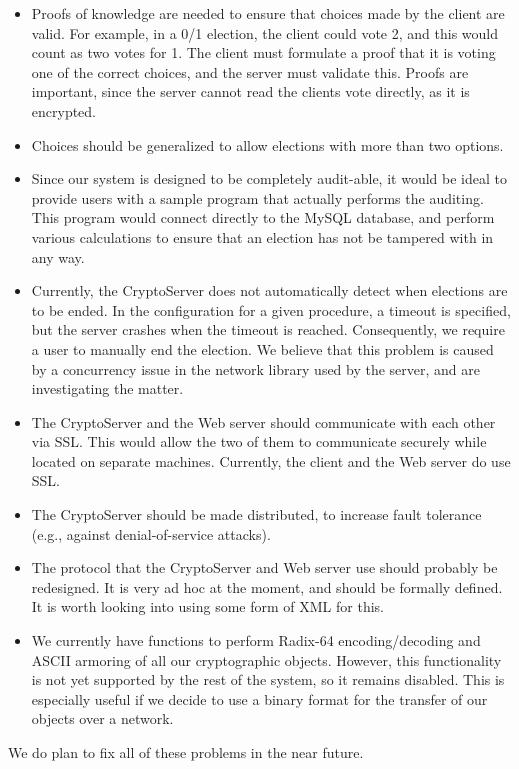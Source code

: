 \documentclass[letterpaper,10pt]{article}
\begin{document}
\begin{itemize}
\item Proofs of knowledge are needed to ensure that choices made by
  the client are valid. For example, in a 0/1 election, the client
  could vote 2, and this would count as two votes for 1.  The client
  must formulate a proof that it is voting one of the correct choices,
  and the server must validate this.  Proofs are important, since the
  server cannot read the clients vote directly, as it is encrypted.
  
\item Choices should be generalized to allow elections with more than
  two options.
  
\item Since our system is designed to be completely audit-able, it
  would be ideal to provide users with a sample program that actually
  performs the auditing.  This program would connect directly to the
  MySQL database, and perform various calculations to ensure that an
  election has not be tampered with in any way.
  
\item Currently, the CryptoServer does not automatically detect when
  elections are to be ended. In the configuration for a given
  procedure, a timeout is specified, but the server crashes when the
  timeout is reached.  Consequently, we require a user to manually end
  the election.  We believe that this problem is caused by a
  concurrency issue in the network library used by the server, and are
  investigating the matter.
  
\item The CryptoServer and the Web server should communicate with each
  other via SSL.  This would allow the two of them to communicate
  securely while located on separate machines. Currently, the client
  and the Web server do use SSL.
  
\item The CryptoServer should be made distributed, to increase fault
  tolerance (e.g., against denial-of-service attacks).
  
\item The protocol that the CryptoServer and Web server use should
  probably be redesigned.  It is very ad hoc at the moment, and should
  be formally defined. It is worth looking into using some form of XML
  for this.
  
\item We currently have functions to perform Radix-64
  encoding/decoding and ASCII armoring of all our cryptographic
  objects.  However, this functionality is not yet supported by the
  rest of the system, so it remains disabled. This is especially
  useful if we decide to use a binary format for the transfer of our
  objects over a network.
\end{itemize}

We do plan to fix all of these problems in the near future.
\end{document}
